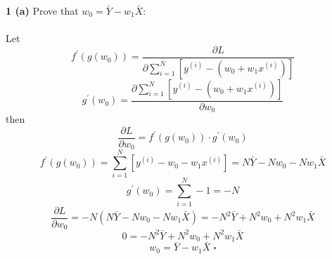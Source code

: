 \documentclass[12 pt]{article}        	%
\begin{document}
\textbf{1 (a)}							%
Prove that $w_0 = \bar{Y} - w_1\bar{X}$: \\ \\
Let 
\begin{displaymath}
  f^\prime(g(w_0))=\frac{\partial L}{\partial \sum_{i=1}^{N}[y^{(i)}-(w_0+w_1x^{(i)})]}
\end{displaymath}
\begin{displaymath}
  g^\prime(w_0)=\frac{\partial \sum_{i=1}^{N}[y^{(i)}-(w_0+w_1x^{(i)})]}{\partial w_0}
\end{displaymath}
then
\begin{displaymath}
  \frac{\partial L}{\partial w_0} = f^\prime(g(w_0)) \cdot g^\prime(w_0) 
\end{displaymath}
\begin{displaymath}
  f^\prime(g(w_0))=\sum_{i=1}^{N}[y^{(i)}-w_0-w_1 x^{(i)}] = N\bar{Y}-Nw_0-Nw_1\bar{X} 
\end{displaymath}
\begin{displaymath}
  g^\prime(w_0)=\sum_{i=1}^{N}-1=-N
\end{displaymath}
\begin{displaymath}
  \frac{\partial L}{\partial w_0} = -N(N\bar{Y}-Nw_0-Nw_1\bar{X})=-N^2\bar{Y}+N^2w_0+N^2w_1\bar{X}
\end{displaymath}
\begin{displaymath}
  0=-N^2\bar{Y}+N^2w_0+N^2w_1\bar{X}
\end{displaymath}
\begin{displaymath}
  w_0=\bar{Y}-w_1\bar{X} \; \square
\end{displaymath}  
\end{document}

